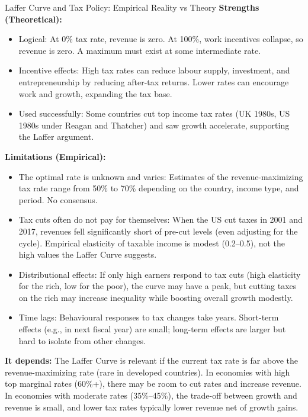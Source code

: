\documentclass[11pt, a4paper, twoside]{book}
\begin{document}
\begin{evaluation}{Laffer Curve and Tax Policy: Empirical Reality vs Theory}
\textbf{Strengths (Theoretical):}
\begin{itemize}
  \item Logical: At 0\% tax rate, revenue is zero. At 100\%, work incentives collapse, so revenue is zero. A maximum must exist at some intermediate rate.
  \item Incentive effects: High tax rates can reduce labour supply, investment, and entrepreneurship by reducing after-tax returns. Lower rates can encourage work and growth, expanding the tax base.
  \item Used successfully: Some countries cut top income tax rates (UK 1980s, US 1980s under Reagan and Thatcher) and saw growth accelerate, supporting the Laffer argument.
\end{itemize}

\textbf{Limitations (Empirical):}
\begin{itemize}
  \item The optimal rate is unknown and varies: Estimates of the revenue-maximizing tax rate range from 50\% to 70\% depending on the country, income type, and period. No consensus.
  \item Tax cuts often do not pay for themselves: When the US cut taxes in 2001 and 2017, revenues fell significantly short of pre-cut levels (even adjusting for the cycle). Empirical elasticity of taxable income is modest (0.2--0.5), not the high values the Laffer Curve suggests.
  \item Distributional effects: If only high earners respond to tax cuts (high elasticity for the rich, low for the poor), the curve may have a peak, but cutting taxes on the rich may increase inequality while boosting overall growth modestly.
  \item Time lags: Behavioural responses to tax changes take years. Short-term effects (e.g., in next fiscal year) are small; long-term effects are larger but hard to isolate from other changes.
\end{itemize}

\textbf{It depends:}
The Laffer Curve is relevant if the current tax rate is far above the revenue-maximizing rate (rare in developed countries). In economies with high top marginal rates (60\%+), there may be room to cut rates and increase revenue. In economies with moderate rates (35\%--45\%), the trade-off between growth and revenue is small, and lower tax rates typically lower revenue net of growth gains.
\end{evaluation}
\end{document}
